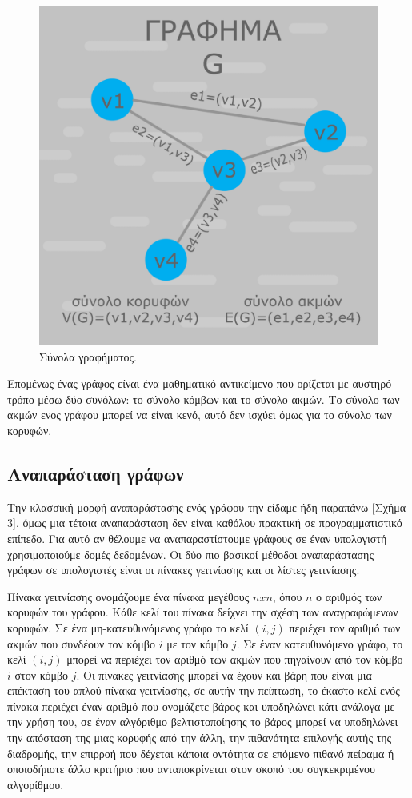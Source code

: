 \begin{figure}
    \centering
    \includegraphics[scale=0.30]{2947_thesis/pictures/synola.png} 
    \caption{Σύνολα γραφήματος.}
\end{figure}

Επομένως ένας γράφος είναι ένα μαθηματικό αντικείμενο που ορίζεται με αυστηρό τρόπο μέσω δύο συνόλων: το σύνολο κόμβων και το σύνολο ακμών. Το σύνολο των ακμών ενος γράφου μπορεί να είναι κενό, αυτό δεν ισχύει όμως για το σύνολο των κορυφών.

\subsection{Αναπαράσταση γράφων}
Την κλασσική μορφή αναπαράστασης ενός γράφου την είδαμε ήδη παραπάνω [Σχήμα 3], όμως μια τέτοια αναπαράσταση δεν είναι καθόλου πρακτική σε προγραμματιστικό επίπεδο. Για αυτό αν θέλουμε να αναπαραστίστουμε γράφους σε έναν υπολογιστή χρησιμοποιούμε δομές δεδομένων. Οι δύο πιο βασικοί μέθοδοι αναπαράστασης γράφων σε υπολογιστές είναι οι πίνακες γειτνίασης και οι λίστες γειτνίασης. 

Πίνακα γειτνίασης ονομάζουμε ένα πίνακα μεγέθους $nxn$, όπου $n$ ο αριθμός των κορυφών του γράφου. Κάθε κελί του πίνακα δείχνει την σχέση των αναγραφώμενων κορυφών. Σε ένα μη-κατευθυνόμενος γράφο το κελί $(i, j)$ περιέχει τον αριθμό των ακμών που συνδέουν τον κόμβο $i$ με τον κόμβο $j$. Σε έναν κατευθυνόμενο γράφο, το κελί $(i, j)$ μπορεί να περιέχει τον αριθμό των ακμών που πηγαίνουν από τον κόμβο $i$ στον κόμβο $j$. Οι πίνακες γειτνίασης μπορεί να έχουν και βάρη που είναι μια επέκταση του απλού πίνακα γειτνίασης, σε αυτήν την πείπτωση, το έκαστο κελί ενός πίνακα περιέχει έναν αριθμό που ονομάζετε βάρος και υποδηλώνει κάτι ανάλογα με την χρήση του, σε έναν αλγόριθμο βελτιστοποίησης το βάρος μπορεί να υποδηλώνει την απόσταση της μιας κορυφής από την άλλη, την πιθανότητα επιλογής αυτής της διαδρομής, την επιρροή που δέχεται κάποια οντότητα σε επόμενο πιθανό πείραμα ή οποιοδήποτε άλλο κριτήριο που ανταποκρίνεται στον σκοπό του συγκεκριμένου αλγορίθμου.

